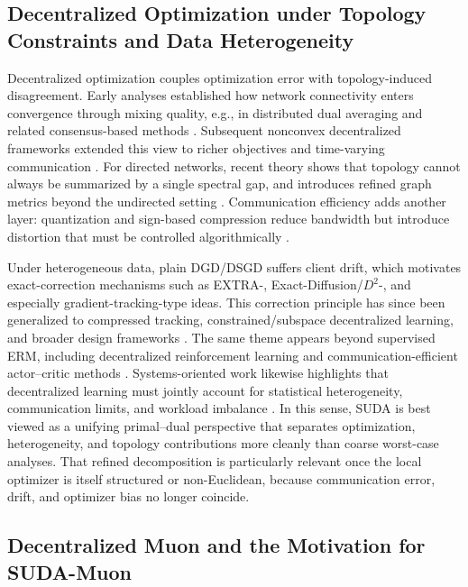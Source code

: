 \documentclass[11pt]{article}
\begin{document}
\subsection{Decentralized Optimization under Topology Constraints and Data Heterogeneity}

Decentralized optimization couples optimization error with topology-induced disagreement. Early analyses established how network connectivity enters convergence through mixing quality, e.g., in distributed dual averaging and related consensus-based methods \citep{duchi2011dual}. Subsequent nonconvex decentralized frameworks extended this view to richer objectives and time-varying communication \citep{di2016next}. For directed networks, recent theory shows that topology cannot always be summarized by a single spectral gap, and introduces refined graph metrics beyond the undirected setting \citep{Liang2023UnderstandingTI}. Communication efficiency adds another layer: quantization and sign-based compression reduce bandwidth but introduce distortion that must be controlled algorithmically \citep{Alistarh2016QSGDCS, Bernstein2018signSGDCO}. 

Under heterogeneous data, plain DGD/DSGD suffers client drift, which motivates exact-correction mechanisms such as EXTRA-, Exact-Diffusion/\(D^2\)-, and especially gradient-tracking-type ideas. This correction principle has since been generalized to compressed tracking, constrained/subspace decentralized learning, and broader design frameworks \citep{Song2021CompressedGT, Nassif2022QuantizationFD, He2024AML}. The same theme appears beyond supervised ERM, including decentralized reinforcement learning and communication-efficient actor--critic methods \citep{jiang2022mdpgt, Ren2025ACD}. Systems-oriented work likewise highlights that decentralized learning must jointly account for statistical heterogeneity, communication limits, and workload imbalance \citep{mohammadabadi2024communication}. In this sense, SUDA is best viewed as a unifying primal--dual perspective that separates optimization, heterogeneity, and topology contributions more cleanly than coarse worst-case analyses. That refined decomposition is particularly relevant once the local optimizer is itself structured or non-Euclidean, because communication error, drift, and optimizer bias no longer coincide.

\subsection{Decentralized Muon and the Motivation for SUDA-Muon}
\end{document}
